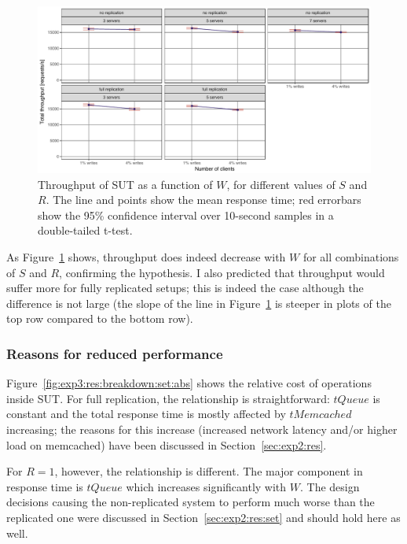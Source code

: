 \documentclass[11pt]{article}
\begin{document}
\begin{figure}[h]
\centering
\includegraphics[width=\textwidth]{../results/writes/graphs/throughput_vs_writes.pdf}
\caption{Throughput of SUT as a function of $W$, for different values of $S$ and $R$. The line and points show the mean response time; red errorbars show the 95\% confidence interval over 10-second samples in a double-tailed t-test.}
\label{fig:exp3:res:throughput}
\end{figure}

As Figure~\ref{fig:exp3:res:throughput} shows, throughput does indeed decrease with $W$ for all combinations of $S$ and $R$, confirming the hypothesis. I also predicted that throughput would suffer more for fully replicated setups; this is indeed the case although the difference is not large (the slope of the line in Figure~\ref{fig:exp3:res:throughput} is steeper in plots of the top row compared to the bottom row).

\subsubsection{Reasons for reduced performance}
Figure~\ref{fig:exp3:res:breakdown:set:abs} shows the relative cost of operations inside SUT. For full replication, the relationship is straightforward: $tQueue$ is constant and the total response time is mostly affected by $tMemcached$ increasing; the reasons for this increase (increased network latency and/or higher load on memcached) have been discussed in Section~\ref{sec:exp2:res}.

For $R=1$, however, the relationship is different. The major component in response time is $tQueue$ which increases significantly with $W$. The design decisions causing the non-replicated system to perform much worse than the replicated one were discussed in Section~\ref{sec:exp2:res:set} and should hold here as well.
\end{document}
